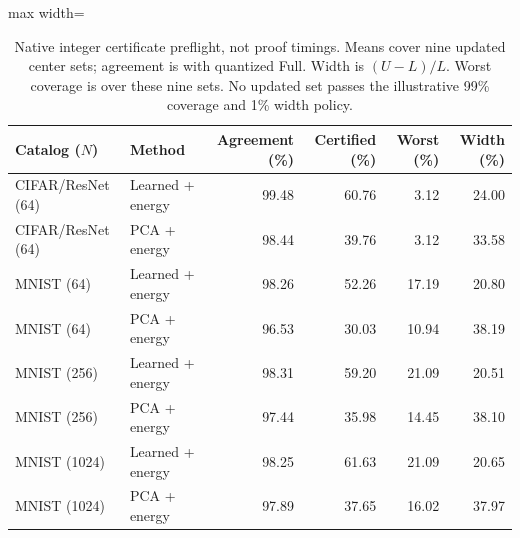 \begin{table}[tp]
\caption{Native integer certificate preflight, not proof timings. Means cover nine updated center sets; agreement is with quantized Full. Width is $(U-L)/L$. Worst coverage is over these nine sets. No updated set passes the illustrative 99\% coverage and 1\% width policy.}\label{tab:native-certificates}
\centering\small
\begin{adjustbox}{max width=\textwidth}
\begin{tabular}{@{}llrrrr@{}}
\toprule
Catalog ($N$) & Method & Agreement (\%) & Certified (\%) & Worst (\%) & Width (\%) \\
\midrule
CIFAR/ResNet (64) & Learned + energy & 99.48 & 60.76 & 3.12 & 24.00 \\
CIFAR/ResNet (64) & PCA + energy & 98.44 & 39.76 & 3.12 & 33.58 \\
MNIST (64) & Learned + energy & 98.26 & 52.26 & 17.19 & 20.80 \\
MNIST (64) & PCA + energy & 96.53 & 30.03 & 10.94 & 38.19 \\
MNIST (256) & Learned + energy & 98.31 & 59.20 & 21.09 & 20.51 \\
MNIST (256) & PCA + energy & 97.44 & 35.98 & 14.45 & 38.10 \\
MNIST (1024) & Learned + energy & 98.25 & 61.63 & 21.09 & 20.65 \\
MNIST (1024) & PCA + energy & 97.89 & 37.65 & 16.02 & 37.97 \\
\bottomrule
\end{tabular}
\end{adjustbox}
\end{table}
